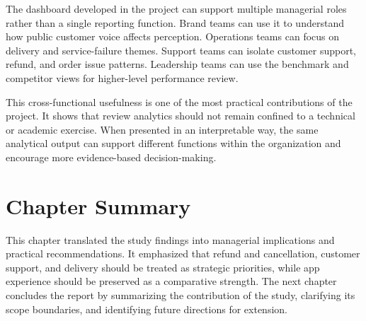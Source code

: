 The dashboard developed in the project can support multiple managerial roles rather than a single reporting function. Brand teams can use it to understand how public customer voice affects perception. Operations teams can focus on delivery and service-failure themes. Support teams can isolate customer support, refund, and order issue patterns. Leadership teams can use the benchmark and competitor views for higher-level performance review.

This cross-functional usefulness is one of the most practical contributions of the project. It shows that review analytics should not remain confined to a technical or academic exercise. When presented in an interpretable way, the same analytical output can support different functions within the organization and encourage more evidence-based decision-making.

\section{Chapter Summary}

This chapter translated the study findings into managerial implications and practical recommendations. It emphasized that refund and cancellation, customer support, and delivery should be treated as strategic priorities, while app experience should be preserved as a comparative strength. The next chapter concludes the report by summarizing the contribution of the study, clarifying its scope boundaries, and identifying future directions for extension.
